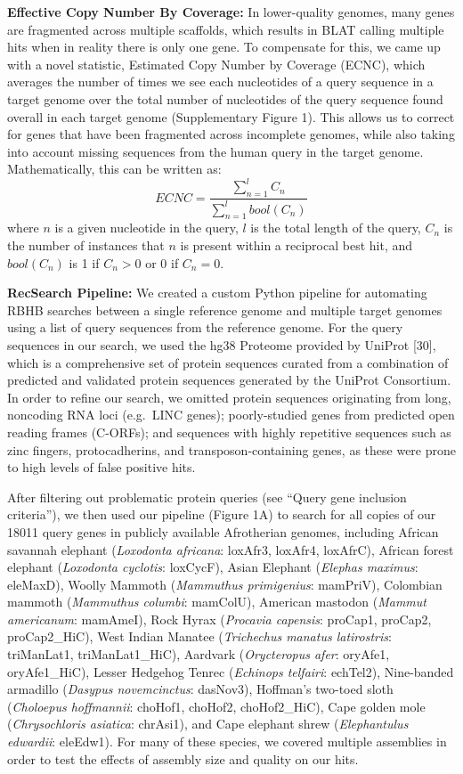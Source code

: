 \documentclass[]{elsarticle} %
\begin{document}
\textbf{Effective Copy Number By Coverage:} In lower-quality genomes,
many genes are fragmented across multiple scaffolds, which results in
BLAT calling multiple hits when in reality there is only one gene. To
compensate for this, we came up with a novel statistic, Estimated Copy
Number by Coverage (ECNC), which averages the number of times we see
each nucleotides of a query sequence in a target genome over the total
number of nucleotides of the query sequence found overall in each target
genome (Supplementary Figure 1). This allows us to correct for genes
that have been fragmented across incomplete genomes, while also taking
into account missing sequences from the human query in the target
genome. Mathematically, this can be written as:\\
\[ ECNC = \frac{\sum_{n=1}^{l} C_n}{\sum_{n=1}^{l} bool(C_n)}\] where
\(n\) is a given nucleotide in the query, \(l\) is the total length of
the query, \(C_n\) is the number of instances that \(n\) is present
within a reciprocal best hit, and \(bool(C_n)\) is 1 if \(C_n > 0\) or 0
if \(C_n = 0\).

\textbf{RecSearch Pipeline:} We created a custom Python pipeline for
automating RBHB searches between a single reference genome and multiple
target genomes using a list of query sequences from the reference
genome. For the query sequences in our search, we used the hg38 Proteome
provided by UniProt {[}30{]}, which is a comprehensive set of protein
sequences curated from a combination of predicted and validated protein
sequences generated by the UniProt Consortium. In order to refine our
search, we omitted protein sequences originating from long, noncoding
RNA loci (e.g.~LINC genes); poorly-studied genes from predicted open
reading frames (C-ORFs); and sequences with highly repetitive sequences
such as zinc fingers, protocadherins, and transposon-containing genes,
as these were prone to high levels of false positive hits.

After filtering out problematic protein queries (see ``Query gene
inclusion criteria''), we then used our pipeline (Figure 1A) to search
for all copies of our 18011 query genes in publicly available
Afrotherian genomes, including African savannah elephant
(\emph{Loxodonta africana}: loxAfr3, loxAfr4, loxAfrC), African forest
elephant (\emph{Loxodonta cyclotis}: loxCycF), Asian Elephant
(\emph{Elephas maximus}: eleMaxD), Woolly Mammoth (\emph{Mammuthus
primigenius}: mamPriV), Colombian mammoth (\emph{Mammuthus columbi}:
mamColU), American mastodon (\emph{Mammut americanum}: mamAmeI), Rock
Hyrax (\emph{Procavia capensis}: proCap1, proCap2, proCap2\_HiC), West
Indian Manatee (\emph{Trichechus manatus latirostris}: triManLat1,
triManLat1\_HiC), Aardvark (\emph{Orycteropus afer}: oryAfe1,
oryAfe1\_HiC), Lesser Hedgehog Tenrec (\emph{Echinops telfairi}:
echTel2), Nine-banded armadillo (\emph{Dasypus novemcinctus}: dasNov3),
Hoffman's two-toed sloth (\emph{Choloepus hoffmannii}: choHof1, choHof2,
choHof2\_HiC), Cape golden mole (\emph{Chrysochloris asiatica}:
chrAsi1), and Cape elephant shrew (\emph{Elephantulus edwardii}:
eleEdw1). For many of these species, we covered multiple assemblies in
order to test the effects of assembly size and quality on our hits.
\end{document}
